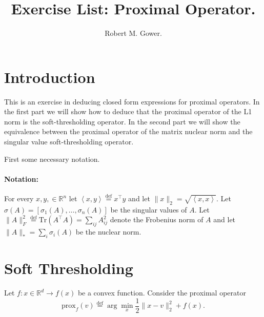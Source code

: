 \documentclass[11pt]{article}
\title{Exercise List: Proximal Operator.}
\author{Robert M. Gower.}
\newcommand{\R}{\mathbb{R}}
\newcommand{\eqdef}{\overset{\text{def}}{=}}
\newcommand{\norm}[1]{\lVert#1\rVert}
\newcommand{\dotprod}[1]{\left< #1\right>}
\newcommand{\Tr}[1]{\mbox{Tr}\left( #1\right)}
\begin{document}
\maketitle
\section{Introduction}
%
This is an exercise in deducing closed form expressions for proximal operators. In the first part we will show how to deduce that the proximal operator of the L1 norm is the soft-thresholding operator. In the second part we will show the equivalence between the proximal operator of the matrix nuclear norm and the singular value soft-thresholding operator.


First some necessary notation.
\paragraph{Notation:} For every $x, y, \in \R^n$ let $\dotprod{x,y} \eqdef x^\top y$ and let $\norm{x}_2 = \sqrt{\dotprod{x,x}}.$ Let $\sigma(A)=[\sigma_1(A), \ldots, \sigma_n(A)]$ be the singular values of $A$.
Let $\norm{A}_F^2 \eqdef \Tr{A^\top A} = \sum_{ij} A_{ij}^2$ denote the Frobenius norm of $A$ and let $\norm{A}_* = \sum_{i} \sigma_i(A)$ be the nuclear norm.

%  
  \section{Soft Thresholding}
  Let $f: x \in \R^d \rightarrow f(x)$ be a convex function. Consider the proximal operator
  \begin{equation}
  \mbox{prox}_{f}(v) \eqdef \arg\min_x \frac{1}{2}\norm{x-v}_2^2 + f(x).
  \end{equation}
\end{document}
